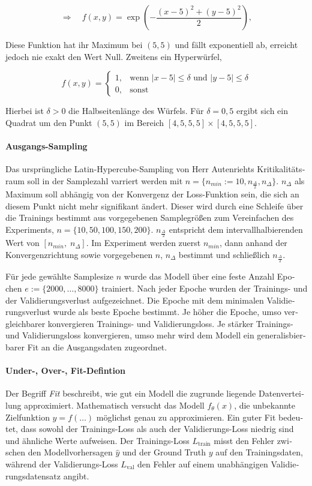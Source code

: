 \begin{otherlanguage}{ngerman}
\[
\Rightarrow \quad f(x, y) = \exp\left( -\frac{(x - 5)^2 + (y - 5)^2}{2} \right),
\]

Diese Funktion hat ihr Maximum bei $(5, 5)$ und fällt exponentiell ab, erreicht jedoch nie exakt den Wert Null. Zweitens ein Hyperwürfel,

\[
f(x, y) =
\begin{cases}
1, & \text{wenn } |x - 5| \leq \delta \text{ und } |y - 5| \leq \delta \\
0, & \text{sonst}
\end{cases}
\]

Hierbei ist $\delta > 0$ die Halbseitenlänge des Würfels. Für $\delta = 0{,}5$ ergibt sich ein Quadrat um den Punkt $(5, 5)$ im Bereich $[4{,}5, 5{,}5] \times [4{,}5, 5{,}5]$.

\paragraph{Ausgangs-Sampling} Das ursprüngliche Latin-Hypercube-Sampling von Herr Autenriehts Kritikalitätsraum soll in der Samplezahl varriert werden mit $n = \{ n_{min} := 10, n_{\frac{\Delta}{2}}, n_{\Delta} \}$. $n_{\Delta}$ als Maximum soll abhängig von der Konvergenz der Loss-Funktion sein, die sich an diesem Punkt nicht mehr signifikant ändert. Dieser wird durch eine Schleife über die Trainings bestimmt aus vorgegebenen Samplegrößen zum Vereinfachen des Experiments, $n = \{ 10, 50, 100, 150, 200 \}$. $n_{\frac{\Delta}{2}}$ entspricht dem intervallhalbierenden Wert von $\left[ n_{min},\; n_{\Delta} \right]$. Im Experiment werden zuerst $n_{min}$, dann anhand der Konvergenzrichtung sowie vorgegebenen $n$, $n_{\Delta}$ bestimmt und schließlich $n_{\frac{\Delta}{2}}$.

Für jede gewählte Samplesize $n$ wurde das Modell über eine feste Anzahl Epochen $e := \{ 2000, \dots, 8000 \}$ trainiert. Nach jeder Epoche wurden der Trainings- und der Validierungsverlust aufgezeichnet. Die Epoche mit dem minimalen Validierungsverlust wurde als beste Epoche bestimmt. Je höher die Epoche, umso vergleichbarer konvergieren Trainings- und Validierungsloss. Je stärker Trainings- und Validierungsloss konvergieren, umso mehr wird dem Modell ein generalisbierbarer Fit an die Ausgangsdaten zugeordnet. 



\paragraph{Under-, Over-, Fit-Defintion} Der Begriff \textit{Fit} beschreibt, wie gut ein Modell die zugrunde liegende Datenverteilung approximiert. Mathematisch versucht das Modell $f_\theta(x)$, die unbekannte Zielfunktion $y = f(\dots)$ möglichst genau zu approximieren. Ein guter Fit bedeutet, dass sowohl der Trainings-Loss als auch der Validierungs-Loss niedrig sind und ähnliche Werte aufweisen. Der Trainings-Loss $L_{\text{train}}$ misst den Fehler zwischen den Modellvorhersagen $\hat{y}$ und der Ground Truth $y$ auf den Trainingsdaten, während der Validierungs-Loss $L_{\text{val}}$ den Fehler auf einem unabhängigen Validierungsdatensatz angibt. 


\end{otherlanguage}
